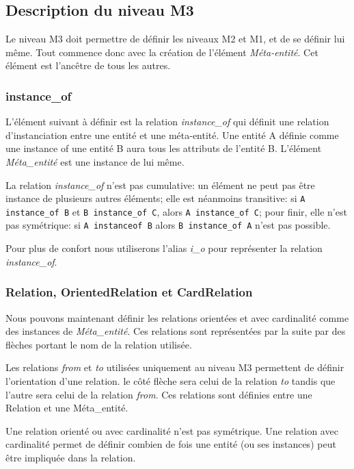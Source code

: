 \documentclass[french,a4paper,titlepage]{article}
\begin{document}
		\subsection{Description du niveau M3}
		
		
			Le niveau M3 doit permettre de définir les niveaux M2 et M1, et de se définir lui même. Tout commence donc avec la création de l'élément \emph{Méta-entité}. Cet élément est l'ancêtre de tous les autres.
			
			\subsubsection{instance\_of}
			
				L'élément suivant à définir est la relation \emph{instance\_of} qui définit une relation d'instanciation entre une entité et une méta-entité. Une entité A définie comme une instance of une entité B aura tous les attributs de l'entité B. L'élément \emph{Méta\_entité} est une instance de lui même.
				
				La relation \emph{instance\_of} n'est pas cumulative: un élément ne peut pas être instance de plusieurs autres éléments; elle est néanmoins transitive: si \verb!A instance_of B! et \verb!B instance_of C!, alors \verb!A instance_of C!; pour finir, elle n'est pas symétrique: si \verb!A instanceof B! alors \verb!B instance_of A! n'est pas possible.
				
				Pour plus de confort nous utiliserons l'alias \emph{i\_o} pour représenter la relation \emph{instance\_of}.
				
			\subsubsection{Relation, OrientedRelation et CardRelation}
			
				Nous pouvons maintenant définir les relations orientées et avec cardinalité comme des instances de \emph{Méta\_entité}.
				Ces relations sont représentées par la suite par des flèches portant le nom de la relation utilisée.
				
				Les relations \emph{from} et \emph{to} utilisées uniquement au niveau M3 permettent de définir l'orientation d'une relation. le côté flèche sera celui de la relation \emph{to} tandis que l'autre sera celui de la relation \emph{from}. Ces relations sont définies entre une Relation et une Méta\_entité.
				
				Une relation orienté ou avec cardinalité n'est pas symétrique. Une relation avec cardinalité permet de définir combien de fois une entité (ou ses instances) peut être impliquée dans la relation.
				
\end{document}

